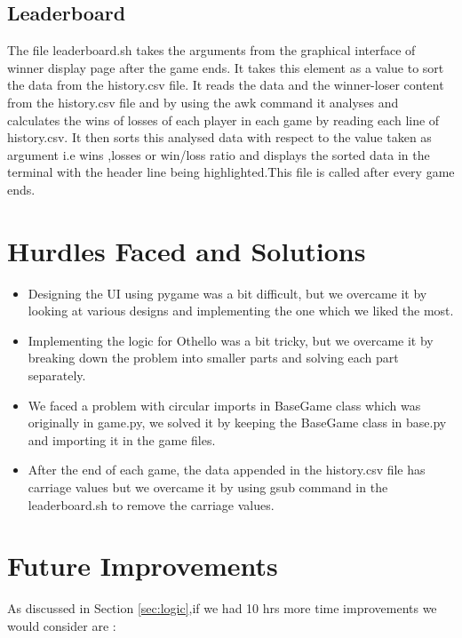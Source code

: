 \documentclass[12pt]{article}
\begin{document}
\subsection{Leaderboard}
\label{sec:leaderboard}

The file leaderboard.sh takes the arguments from the graphical interface of winner display page after the game ends. It takes this element as a value to sort the data from the history.csv file. It reads the data and the winner-loser content from the history.csv file and by using the awk command it analyses and calculates the wins of losses of each player in each game by reading each line of history.csv. It then sorts this analysed data with respect to the value taken as argument i.e wins ,losses or win/loss ratio and displays the sorted data in the terminal with the header line being highlighted.This file is called after every game ends.



\section{Hurdles Faced and Solutions}
\label{sec:hurdles}

\begin{itemize}
  \item Designing the UI using pygame was a bit difficult, but we overcame it by looking at various designs and implementing the one which we liked the most.
  \item Implementing the logic for Othello was a bit tricky, but we overcame it by breaking down the problem into smaller parts and solving each part separately.
  \item We faced a problem with circular imports in BaseGame class which was originally in game.py, we solved it by keeping the BaseGame class in base.py and importing it in the game files.
  \item After the end of each game, the data appended in the history.csv file has carriage values but we overcame it by using gsub command in the leaderboard.sh to remove the carriage values.
\end{itemize}

\newpage
\section{Future Improvements}
\label{sec:future}

As discussed in Section \ref{sec:logic},if we had 10 hrs more time improvements we would consider are :
\end{document}
